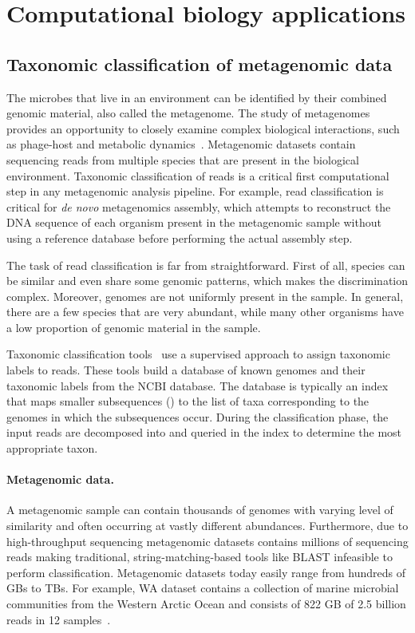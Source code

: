 
\section{Computational biology applications}


\subsection{Taxonomic classification of metagenomic data}

The microbes that live in an environment can be identified by their combined genomic material, also called the metagenome.
The study of metagenomes provides an opportunity to closely examine complex biological interactions, such as phage-host and metabolic dynamics~\cite{national2007new}.
%
Metagenomic datasets contain sequencing reads from multiple species that are present in the biological environment. 
Taxonomic classification of reads is a critical first computational step in any metagenomic analysis pipeline.
For example, read classification is critical for \emph{de novo} metagenomics assembly, which attempts to reconstruct the DNA sequence of each organism present in the metagenomic sample without using a reference database before performing the actual assembly step.

The task of read classification is far from straightforward.
First of all, species can be similar and even share some genomic patterns, which makes the discrimination complex. 
Moreover, genomes are not uniformly present in the sample.
In general, there are a few species that are very abundant, while many other organisms have a low proportion of genomic material in the sample.

Taxonomic classification tools~\cite{ames2013scalable, kim2016centrifuge, menzel2016fast, wood2014kraken, wood2019improved, dilthey2019strain,liu2018novel} use a supervised approach to assign taxonomic labels to reads.
These tools build a database of known genomes and their taxonomic labels from the NCBI database. 
The database is typically an index that maps smaller subsequences (\kmers) to the list of taxa corresponding to the genomes in which the subsequences occur. 
During the classification phase, the input reads are decomposed into \kmers and queried in the index to determine the most appropriate taxon.


\paragraph{Metagenomic data.}
A metagenomic sample can contain thousands of genomes with varying level of similarity and often occurring at vastly different abundances. Furthermore, due to high-throughput sequencing metagenomic datasets contains millions of sequencing reads making traditional, string-matching-based tools like BLAST infeasible to perform classification. Metagenomic datasets today easily range from hundreds of GBs to TBs. For example, WA dataset contains a collection of marine microbial communities from the Western Arctic Ocean and consists of 822 GB of 2.5 billion reads in 12 samples~\cite{hofmeyr2020terabase}.

